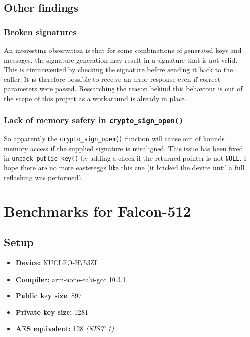 \documentclass[
]{article}
\providecommand{\tightlist}{%
  \setlength{\itemsep}{0pt}\setlength{\parskip}{0pt}}
\begin{document}
\hypertarget{other-findings}{%
\subsection{Other findings}\label{other-findings}}

\hypertarget{broken-signatures}{%
\subsubsection{Broken signatures}\label{broken-signatures}}

An interesting observation is that for some combinations of generated
keys and messages, the signature generation may result in a signature
that is not valid. This is circumvented by checking the signature before
sending it back to the caller. It is therefore possible to receive an
error response even if correct parameters were passed. Researching the
reason behind this behaviour is out of the scope of this project as a
workaround is already in place.

\hypertarget{lack-of-memory-safety-in-crypto_sign_open}{%
\subsubsection{\texorpdfstring{Lack of memory safety in
\texttt{crypto\_sign\_open()}}{Lack of memory safety in crypto\_sign\_open()}}\label{lack-of-memory-safety-in-crypto_sign_open}}

So apparently the \texttt{crypto\_sign\_open()} function will cause out
of bounds memory access if the supplied signature is misaligned. This
issue has been fixed in \texttt{unpack\_public\_key()} by adding a check
if the returned pointer is not \texttt{NULL}. I hope there are no more
eastereggs like this one (it bricked the device until a full reflashing
was performed).

\hypertarget{benchmarks-for-falcon-512}{%
\section{Benchmarks for Falcon-512}\label{benchmarks-for-falcon-512}}

\hypertarget{setup-1}{%
\subsection{Setup}\label{setup-1}}

\begin{itemize}
\tightlist
\item
  \textbf{Device:} NUCLEO-H753ZI
\item
  \textbf{Compiler:} arm-none-eabi-gcc 10.3.1
\item
  \textbf{Public key size:} 897
\item
  \textbf{Private key size:} 1281
\item
  \textbf{AES equivalent:} 128 \textit{(NIST 1)}
\end{itemize}
\end{document}
